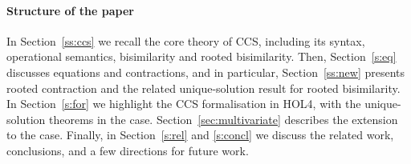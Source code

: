 \paragraph{Structure of the paper}

In Section~\ref{ss:ccs} we recall the core theory of CCS,
including its syntax, operational semantics, bisimilarity and rooted
bisimilarity.
Then, Section~\ref{s:eq} discusses equations and contractions, and in particular,
Section~\ref{ss:new} presents rooted contraction and the related
unique-solution result for rooted bisimilarity.
In Section~\ref{s:for} we highlight the CCS formalisation in HOL4, with
the unique-solution theorems in the \univariate case.
Section~\ref{sec:multivariate} describes the extension to the \multivariate case.
Finally, in Section~\ref{s:rel} and \ref{s:concl} we discuss the related work,
conclusions, and a few directions for future work.

